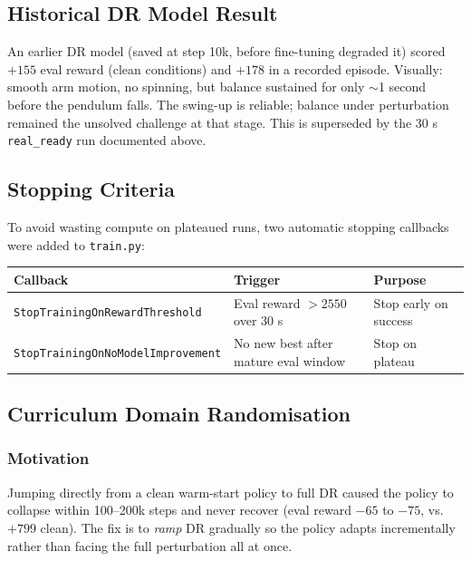 \documentclass[12pt,a4paper]{article}
\begin{document}
\subsection{Historical DR Model Result}

An earlier DR model (saved at step 10k, before fine-tuning degraded it) scored
$+155$ eval reward (clean conditions) and $+178$ in a recorded episode.
Visually: smooth arm motion, no spinning, but balance sustained for only
$\sim$1 second before the pendulum falls. The swing-up is reliable; balance
under perturbation remained the unsolved challenge at that stage.  This is
superseded by the 30 s \texttt{real\_ready} run documented above.

\subsection{Stopping Criteria}

To avoid wasting compute on plateaued runs, two automatic stopping callbacks
were added to \texttt{train.py}:

\begin{center}
\begin{tabular}{lll}
\toprule
\textbf{Callback} & \textbf{Trigger} & \textbf{Purpose} \\
\midrule
\texttt{StopTrainingOnRewardThreshold} & Eval reward $> 2550$ over 30 s & Stop early on success \\
\texttt{StopTrainingOnNoModelImprovement} & No new best after mature eval window & Stop on plateau \\
\bottomrule
\end{tabular}
\end{center}

\subsection{Curriculum Domain Randomisation}

\subsubsection{Motivation}

Jumping directly from a clean warm-start policy to full DR caused the policy to
collapse within 100--200k steps and never recover (eval reward $-65$ to $-75$,
vs.\ $+799$ clean). The fix is to \emph{ramp} DR gradually so the policy
adapts incrementally rather than facing the full perturbation all at once.
\end{document}
